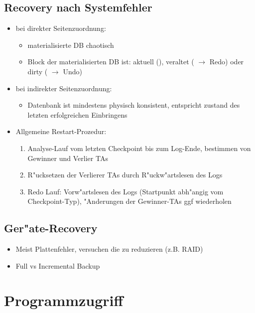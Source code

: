 \documentclass[a4paper, 12pt]{scrartcl}
\begin{document}
\subsection{Recovery nach Systemfehler}
\begin{itemize}
	\item
		bei direkter Seitenzuordnung:
		\begin{itemize}
			\item
				materialisierte DB chaotisch
			\item
				Block der materialisierten DB ist: aktuell (\checkmark), veraltet ( $\rightarrow$ Redo) oder dirty ( $\rightarrow$ Undo)
		\end{itemize}
	\item
		bei indirekter Seitenzuordnung:
		\begin{itemize}
			\item
				Datenbank ist mindestens physisch konsistent, entspricht zustand des letzten erfolgreichen Einbringens
		\end{itemize}
	\item
		Allgemeine Restart-Prozedur:
		\begin{enumerate}
			\item
				Analyse-Lauf vom letzten Checkpoint bis zum Log-Ende, bestimmen von Gewinner und Verlier TAs
			\item
				R"ucksetzen der Verlierer TAs durch R"uckw"artslesen des Logs
			\item
				Redo Lauf: Vorw"artslesen des Logs (Startpunkt abh"angig vom Checkpoint-Typ), "Anderungen der Gewinner-TAs ggf wiederholen
		\end{enumerate}
\end{itemize}

\subsection{Ger"ate-Recovery}
\begin{itemize}
	\item
		Meist Plattenfehler, versuchen die zu reduzieren (z.B. RAID)
	\item
		Full vs Incremental Backup
\end{itemize}

\section{Programmzugriff}
\end{document}
